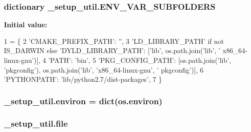 \subsubsection[{\texorpdfstring{E\+N\+V\+\_\+\+V\+A\+R\+\_\+\+S\+U\+B\+F\+O\+L\+D\+E\+RS}{ENV_VAR_SUBFOLDERS}}]{\setlength{\rightskip}{0pt plus 5cm}dictionary \+\_\+setup\+\_\+util.\+E\+N\+V\+\_\+\+V\+A\+R\+\_\+\+S\+U\+B\+F\+O\+L\+D\+E\+RS}\hypertarget{namespace__setup__util_aa31804f1be8660156ce9394b33c68dc4}{}\label{namespace__setup__util_aa31804f1be8660156ce9394b33c68dc4}
{\bfseries Initial value\+:}
\begin{DoxyCode}
1 = \{
2     \textcolor{stringliteral}{'CMAKE\_PREFIX\_PATH'}: \textcolor{stringliteral}{''},
3     \textcolor{stringliteral}{'LD\_LIBRARY\_PATH'} \textcolor{keywordflow}{if} \textcolor{keywordflow}{not} IS\_DARWIN \textcolor{keywordflow}{else} \textcolor{stringliteral}{'DYLD\_LIBRARY\_PATH'}: [\textcolor{stringliteral}{'lib'}, os.path.join(\textcolor{stringliteral}{'lib'}, \textcolor{stringliteral}{'
      x86\_64-linux-gnu'})],
4     \textcolor{stringliteral}{'PATH'}: \textcolor{stringliteral}{'bin'},
5     \textcolor{stringliteral}{'PKG\_CONFIG\_PATH'}: [os.path.join(\textcolor{stringliteral}{'lib'}, \textcolor{stringliteral}{'pkgconfig'}), os.path.join(\textcolor{stringliteral}{'lib'}, \textcolor{stringliteral}{'x86\_64-linux-gnu'}, \textcolor{stringliteral}{'
      pkgconfig'})],
6     \textcolor{stringliteral}{'PYTHONPATH'}: \textcolor{stringliteral}{'lib/python2.7/dist-packages'},
7 \}
\end{DoxyCode}
\subsubsection[{\texorpdfstring{environ}{environ}}]{\setlength{\rightskip}{0pt plus 5cm}\+\_\+setup\+\_\+util.\+environ = dict(os.\+environ)}\hypertarget{namespace__setup__util_a9a935bdd9ee1aa0327161025bb18c136}{}\label{namespace__setup__util_a9a935bdd9ee1aa0327161025bb18c136}
\subsubsection[{\texorpdfstring{file}{file}}]{\setlength{\rightskip}{0pt plus 5cm}\+\_\+setup\+\_\+util.\+file}\hypertarget{namespace__setup__util_aea63a1b32cc79bc3d872ab7cb30dd07e}{}\label{namespace__setup__util_aea63a1b32cc79bc3d872ab7cb30dd07e}
